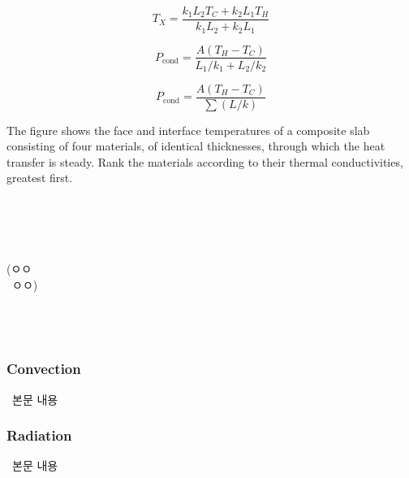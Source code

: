 \begin{equation} T_X = \frac{k_1 L_2 T_C + k_2 L_1 T_H}{k_1 L_2 + k_2 L_1} \end{equation}

\begin{equation} P_{\text{cond}} = \frac{A(T_H - T_C)}{L_1 / k_1 + L_2 / k_2} \end{equation}

\begin{equation} P_{\text{cond}} = \frac{A(T_H - T_C)}{\sum (L / k)} \end{equation}

\begin{checkbox}
The figure shows the face and interface temperatures of a composite slab
consisting of four materials, of identical thicknesses, through
which the heat transfer is steady. Rank the materials according
to their thermal conductivities, greatest first.\\
%

\end{checkbox}

\begin{solbox}
\bnset
{} \\
\bn  \\
\bn  \\
\bn  \\
\hspace*{1em} (ㅇㅇ \\
\hspace*{1em} \, ㅇㅇ) \\

 \\
 \\
 \\

\end{solbox}

\subsubsection{Convection}
%
\ 본문 내용

\subsubsection{Radiation}
%
\ 본문 내용

